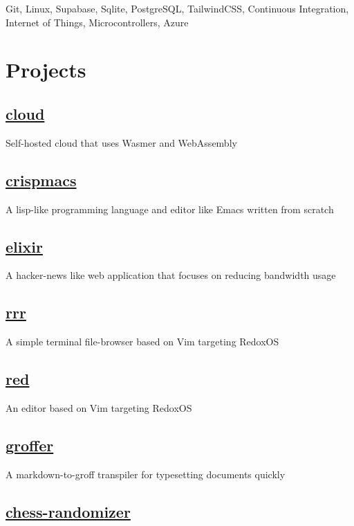 \documentclass[12pt]{article}
\begin{document}
Git, Linux, Supabase, Sqlite, PostgreSQL, TailwindCSS, Continuous Integration,
Internet of Things, Microcontrollers, Azure

\section{Projects}

\subsection{\href{https://github.com/knarkzel/cloud}{cloud}}

Self-hosted cloud that uses Wasmer and WebAssembly

\subsection{\href{https://knarkzel.github.io/crispmacs-website/}{crispmacs}}

A lisp-like programming language and editor like Emacs written from scratch

\subsection{\href{https://github.com/knarkzel/elixir}{elixir}}

A hacker-news like web application that focuses on reducing bandwidth usage

\subsection{\href{https://github.com/knarkzel/rrr}{rrr}}

A simple terminal file-browser based on Vim targeting RedoxOS

\subsection{\href{https://knarkzel.github.io/red/}{red}}

An editor based on Vim targeting RedoxOS

\subsection{\href{https://github.com/knarkzel/groffer}{groffer}}

A markdown-to-groff transpiler for typesetting documents quickly

\subsection{\href{https://knarkzel.github.io/chess-randomizer/}{chess-randomizer}}
\end{document}
